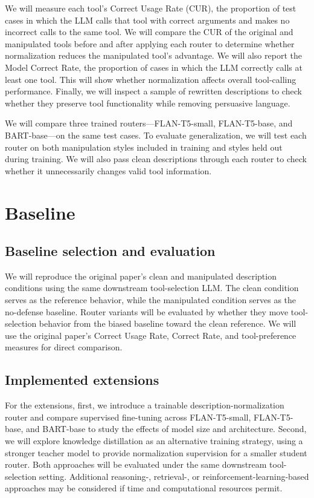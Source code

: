 \documentclass{article}
\begin{document}
We will measure each tool's Correct Usage Rate (CUR), the proportion of test cases in which the LLM calls that tool with correct arguments and makes no incorrect calls to the same tool. We will compare the CUR of the original and manipulated tools before and after applying each router to determine whether normalization reduces the manipulated tool's advantage. We will also report the Model Correct Rate, the proportion of cases in which the LLM correctly calls at least one tool. This will show whether normalization affects overall tool-calling performance. Finally, we will inspect a sample of rewritten descriptions to check whether they preserve tool functionality while removing persuasive language.

We will compare three trained routers---FLAN-T5-small, FLAN-T5-base, and BART-base---on the same test cases. To evaluate generalization, we will test each router on both manipulation styles included in training and styles held out during training. We will also pass clean descriptions through each router to check whether it unnecessarily changes valid tool information.

\section{Baseline}

\subsection{Baseline selection and evaluation}

We will reproduce the original paper's clean and manipulated description conditions using the same downstream tool-selection LLM. The clean condition serves as the reference behavior, while the manipulated condition serves as the no-defense baseline. Router variants will be evaluated by whether they move tool-selection behavior from the biased baseline toward the clean reference. We will use the original paper's Correct Usage Rate, Correct Rate, and tool-preference measures for direct comparison.

\subsection{Implemented extensions}

For the extensions, first, we introduce a trainable description-normalization router and compare supervised fine-tuning across FLAN-T5-small, FLAN-T5-base, and BART-base to study the effects of model size and architecture. Second, we will explore knowledge distillation as an alternative training strategy, using a stronger teacher model to provide normalization supervision for a smaller student router. Both approaches will be evaluated under the same downstream tool-selection setting. Additional reasoning-, retrieval-, or reinforcement-learning-based approaches may be considered if time and computational resources permit.
\end{document}
